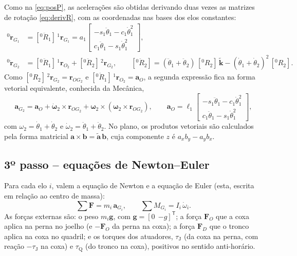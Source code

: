 \documentclass[12pt,a4paper,twoside]{article}
\newcommand{\rv}[2]{{}^{#1}\mathbf{r}_{#2}}          %
\newcommand{\rvdd}[2]{{}^{#1}\ddot{\mathbf{r}}_{#2}}
\newcommand{\Rmdd}[2]{[{}^{#1}\ddot R_{#2}]}
\newcommand{\Et}{\tilde{\mathbf k}}                   %
\newcommand{\Rm}[2]{[{}^{#1}R_{#2}]}                 %
\numberwithin{equation}{section}
\begin{document}
Como na \cref{eq:posP}, as acelerações são obtidas derivando duas vezes as matrizes de
rotação \eqref{eq:derivR}, com as coordenadas nas bases dos elos constantes:
\begin{align}
  \rvdd{0}{G_1} &= \Rmdd{0}{1}\,\rv{1}{G_1}
     = a_1\begin{bmatrix} -s_1\ddot\theta_1 - c_1\dot\theta_1^2 \\ c_1\ddot\theta_1 - s_1\dot\theta_1^2 \end{bmatrix},\\
  \rvdd{0}{G_2} &= \Rmdd{0}{1}\,\rv{1}{O_2} + \Rmdd{0}{2}\,\rv{2}{G_2},
  \qquad
  \Rmdd{0}{2} = (\ddot\theta_1+\ddot\theta_2)\,\Rm{0}{2}\,\Et - (\dot\theta_1+\dot\theta_2)^2\,\Rm{0}{2} .
\end{align}
Como $\Rm{0}{2}\,\rv{2}{G_2} = \mathbf r_{OG_2}$ e $\Rmdd{0}{1}\,\rv{1}{O_2} = \mathbf a_O$, a segunda expressão
fica na forma vetorial equivalente, conhecida da Mecânica,
\begin{equation}
  \mathbf a_{G_2} = \mathbf a_O + \dot{\boldsymbol\omega}_2\times\mathbf r_{OG_2}
                   + \boldsymbol\omega_2\times(\boldsymbol\omega_2\times\mathbf r_{OG_2}),
  \qquad
  \mathbf a_O = \ell_1\begin{bmatrix} -s_1\ddot\theta_1 - c_1\dot\theta_1^2 \\ c_1\ddot\theta_1 - s_1\dot\theta_1^2\end{bmatrix},
\end{equation}
com $\omega_2 = \dot\theta_1 + \dot\theta_2$ e $\dot\omega_2 = \ddot\theta_1 + \ddot\theta_2$. No plano, os
produtos vetoriais são calculados pela forma matricial $\mathbf a\times\mathbf b = \tilde{\mathbf a}\,\mathbf b$,
cuja componente $z$ é $a_x b_y - a_y b_x$.

\subsection{3º passo -- equações de Newton--Euler}

Para cada elo $i$, valem a equação de Newton e a equação de Euler (esta, escrita em
relação ao centro de massa):
\begin{equation}
  \sum \mathbf F = m_i\,\mathbf a_{G_i},
  \qquad
  \sum M_{G_i} = I_i\,\dot\omega_i .
\end{equation}
As forças externas são: o peso $m_i\mathbf g$, com $\mathbf g = [0\ \ {-g}]^{\mathsf T}$; a força
$\mathbf F_O$ que a coxa aplica na perna no joelho (e $-\mathbf F_O$ da perna na coxa); a força
$\mathbf F_D$ que o tronco aplica na coxa no quadril; e os torques dos atuadores,
$\tau_{\mathrm J}$ (da coxa na perna, com reação $-\tau_{\mathrm J}$ na coxa) e $\tau_{\mathrm Q}$ (do
tronco na coxa), positivos no sentido anti-horário.
\end{document}
